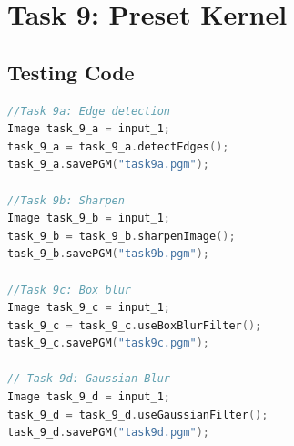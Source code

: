 \documentclass[pdftex,a4paper,10pt,titlepage]{article}
\begin{document}
\pagebreak

\section{Task 9: Preset Kernel}
\subsection{Testing Code}
\begin{lstlisting}[language=C++]
//Task 9a: Edge detection
Image task_9_a = input_1;
task_9_a = task_9_a.detectEdges();
task_9_a.savePGM("task9a.pgm");

//Task 9b: Sharpen
Image task_9_b = input_1;
task_9_b = task_9_b.sharpenImage();
task_9_b.savePGM("task9b.pgm");

//Task 9c: Box blur
Image task_9_c = input_1;
task_9_c = task_9_c.useBoxBlurFilter();
task_9_c.savePGM("task9c.pgm");

// Task 9d: Gaussian Blur
Image task_9_d = input_1;
task_9_d = task_9_d.useGaussianFilter();
task_9_d.savePGM("task9d.pgm");
\end{lstlisting}
\end{document}
